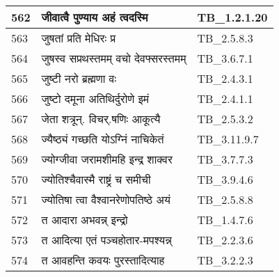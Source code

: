 \documentclass[17pt]{extarticle}
\begin{document}
\begin{longtable}{||p{0.4in}||p{4.9in}||p{0.9in}||}
    562 & जीवात्वै पुण्याय अहं त्वदस्मि & TB\_1.2.1.20       \\
    
    \hline
        
    563 & जुषतां प्रति मेधिरः प्र & TB\_2.5.8.3       \\
    
    \hline
        
    564 & जुषस्व सप्रथस्तमम् वचो देवफ्सरस्तमम् & TB\_3.6.7.1       \\
    
    \hline
        
    565 & जुष्टी नरो ब्रह्मणा वः & TB\_2.4.3.1       \\
    
    \hline
        
    566 & जुष्टो दमूना अतिथिर्दुरोणे इमं & TB\_2.4.1.1       \\
    
    \hline
        
    567 & जेता शत्रून्. विचर्.षणिः आकूत्यै & TB\_2.5.3.2       \\
    
    \hline
        
    568 & ज्यैष्ठ्यं गच्छति योऽग्निं नाचिकेतं & TB\_3.11.9.7       \\
    
    \hline
        
    569 & ज्योग्जीवा जरामशीमहि इन्द्र शाक्वर & TB\_3.7.7.3       \\
    
    \hline
        
    570 & ज्योतिश्चैवास्मै राष्ट्रं च समीची & TB\_3.9.4.6       \\
    
    \hline
        
    571 & ज्योतिषा त्वा वैश्वानरेणोपतिष्ठे अयं & TB\_2.5.8.8       \\
    
    \hline
        
    572 & त आदारा अभवन्न् इन्द्रो & TB\_1.4.7.6       \\
    
    \hline
        
    573 & त आदित्या एतं पञ्चहोतार{-}मपश्यन्न् & TB\_2.2.3.6       \\
    
    \hline
        
    574 & त आवहन्ति कवयः पुरस्तादित्याह & TB\_3.2.2.3       \\
    

\end{longtable}
\end{document}
